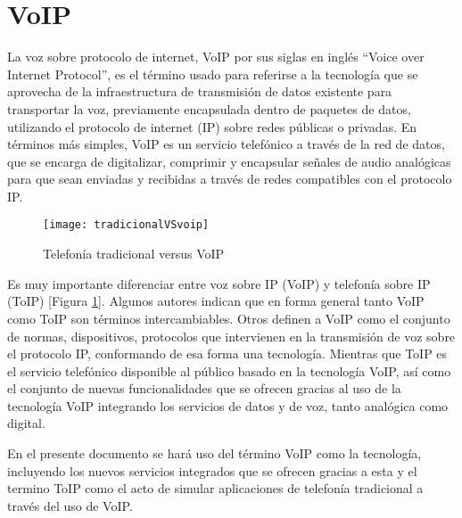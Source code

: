 	
	\section{VoIP}
	
	La voz sobre protocolo de internet, VoIP por sus siglas en 
	inglés “Voice over Internet Protocol”, es el término usado 
	para referirse a la tecnología que se aprovecha de la 
	infraestructura de transmisión de datos existente para 
	transportar la voz, previamente encapsulada dentro de paquetes 
	de datos, utilizando el protocolo de internet (IP) sobre 
	redes públicas o privadas. En términos más simples, VoIP 
	es un servicio telefónico a través de la red de datos, 
	que se encarga de digitalizar, comprimir y encapsular 
	señales de audio analógicas para que sean enviadas y recibidas 
	a través de redes compatibles con el protocolo IP.
	
	\begin{figure}[h]
		
		\texttt{[image: tradicionalVSvoip]}
		
		\caption{Telefonía tradicional versus VoIP}
		
		\centering
		
		\label{fig:ttvsv}
	\end{figure}

	Es muy importante diferenciar entre voz sobre IP (VoIP) y telefonía sobre IP 
	(ToIP) [Figura \ref{fig:ttvsv}]. Algunos autores \cite{switching} indican que 
	en forma general tanto VoIP como ToIP son términos intercambiables. Otros 
	\cite{voiptoip} definen a VoIP como el conjunto de normas, dispositivos, 
	protocolos que intervienen en la transmisión de voz sobre el protocolo IP, 
	conformando de esa forma una tecnología. Mientras que ToIP es el servicio 
	telefónico disponible al público basado en la tecnología VoIP, así como el conjunto de nuevas 
	funcionalidades que se ofrecen gracias al uso de la tecnología VoIP integrando 
	los servicios de datos y de voz, tanto analógica como digital. 
	
	En el presente documento se hará uso del término VoIP como la tecnología, 
	incluyendo los nuevos servicios integrados que se ofrecen gracias a esta 
	y el termino ToIP como el acto de simular aplicaciones de telefonía 
	tradicional a través del uso de VoIP.
	
